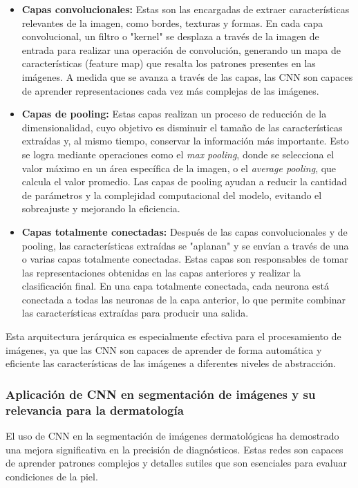 \begin{itemize}
    \item \textbf{Capas convolucionales:} Estas son las encargadas de extraer características relevantes de la imagen, como bordes, texturas y formas. En cada capa convolucional, un filtro o "kernel" se desplaza a través de la imagen de entrada para realizar una operación de convolución, generando un mapa de características (feature map) que resalta los patrones presentes en las imágenes. A medida que se avanza a través de las capas, las CNN son capaces de aprender representaciones cada vez más complejas de las imágenes.
    
    \item \textbf{Capas de pooling:} Estas capas realizan un proceso de reducción de la dimensionalidad, cuyo objetivo es disminuir el tamaño de las características extraídas y, al mismo tiempo, conservar la información más importante. Esto se logra mediante operaciones como el \textit{max pooling}, donde se selecciona el valor máximo en un área específica de la imagen, o el \textit{average pooling}, que calcula el valor promedio. Las capas de pooling ayudan a reducir la cantidad de parámetros y la complejidad computacional del modelo, evitando el sobreajuste y mejorando la eficiencia.
    
    \item \textbf{Capas totalmente conectadas:} Después de las capas convolucionales y de pooling, las características extraídas se "aplanan" y se envían a través de una o varias capas totalmente conectadas. Estas capas son responsables de tomar las representaciones obtenidas en las capas anteriores y realizar la clasificación final. En una capa totalmente conectada, cada neurona está conectada a todas las neuronas de la capa anterior, lo que permite combinar las características extraídas para producir una salida.
\end{itemize}

Esta arquitectura jerárquica es especialmente efectiva para el procesamiento de imágenes, ya que las CNN son capaces de aprender de forma automática y eficiente las características de las imágenes a diferentes niveles de abstracción. \parencite{krizhevsky2012}

\subsubsection{Aplicación de CNN en segmentación de imágenes y su relevancia para la dermatología}
El uso de CNN en la segmentación de imágenes dermatológicas ha demostrado una mejora significativa en la precisión de diagnósticos. Estas redes son capaces de aprender patrones complejos y detalles sutiles que son esenciales para evaluar condiciones de la piel. \parencite{esteva2017}

